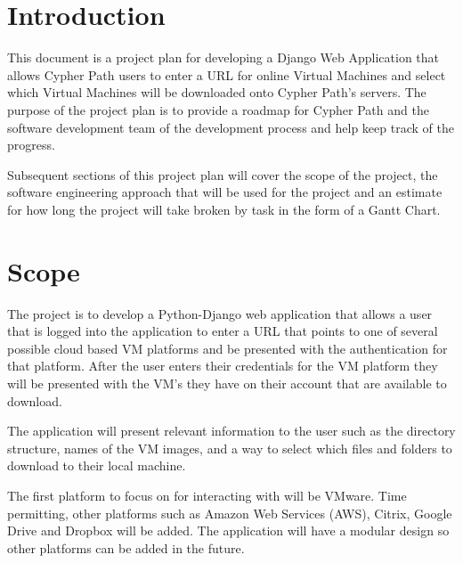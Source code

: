 \documentclass{article}
\title{}
\author{}
\date{}
\begin{document}
    

    \tableofcontents
    \listoffigures

    \newpage
    \begin{versionhistory}
    \end{versionhistory}
    \newpage


    \section{Introduction}
    This document is a project plan for developing a Django Web Application that allows Cypher Path users to enter
    a URL for online Virtual Machines and select which Virtual Machines will be downloaded onto Cypher Path's 
    servers. The purpose of the project plan is to provide a roadmap for Cypher Path and the software development
    team of the development process and help keep track of the progress.

    Subsequent sections of this project plan will cover the scope of the project, the software engineering
    approach that will be used for the project and an estimate for how long the project will take broken by task
    in the form of a Gantt Chart.

    \section{Scope}
    The project is to develop a Python-Django web application that allows a user that is logged into the application to enter a URL that points to one of several
    possible cloud based VM platforms and be presented with the authentication for that platform. After the user enters their credentials for the VM platform 
    they will be presented with the VM's they have on their account that are available to download.
    
    The application will present relevant information to the user such as the directory structure, names of the VM images, and a way to select which files and folders
    to download to their local machine.

    The first platform to focus on for interacting with will be VMware. Time permitting, other platforms such as Amazon Web Services (AWS), Citrix, Google Drive and Dropbox
    will be added. The application will have a modular design so other platforms can be added in the future.
\end{document}
